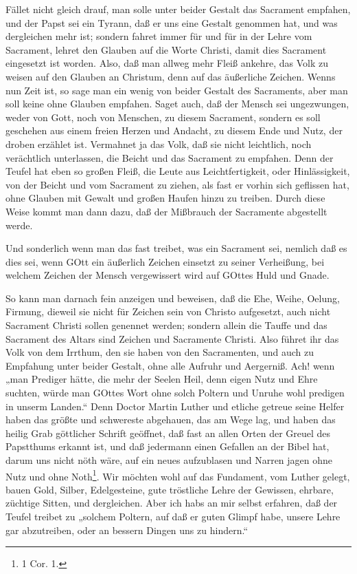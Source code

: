 Fället nicht gleich drauf, man solle unter beider Gestalt das Sacrament empfahen, und der Papst sei ein Tyrann, daß er uns eine Gestalt genommen hat, und was dergleichen mehr ist; sondern fahret immer für und für in der Lehre vom Sacrament, lehret den Glauben auf die Worte Christi, damit dies Sacrament eingesetzt ist worden. Also, daß man allweg mehr Fleiß ankehre, das Volk zu weisen auf den Glauben an Christum, denn auf das äußerliche Zeichen. Wenns nun Zeit ist, so sage man ein wenig von beider Gestalt des Sacraments, aber man soll keine ohne Glauben empfahen. Saget auch, daß der Mensch sei ungezwungen, weder von Gott, noch von Menschen,
zu diesem Sacrament, sondern es soll geschehen aus einem freien Herzen und Andacht, zu diesem Ende und Nutz, der droben erzählet ist. Vermahnet ja das Volk, daß sie nicht leichtlich, noch verächtlich unterlassen, die Beicht und das Sacrament zu empfahen. Denn der Teufel hat eben so großen Fleiß, die Leute aus Leichtfertigkeit, oder Hinlässigkeit, von der Beicht und vom Sacrament zu ziehen, als fast er vorhin sich geflissen hat, ohne Glauben mit Gewalt und großen Haufen hinzu zu treiben. Durch diese Weise kommt man dann dazu, daß der Mißbrauch der Sacramente abgestellt werde.

Und sonderlich wenn man das fast treibet, was ein Sacrament sei, nemlich daß es dies sei, wenn GOtt ein äußerlich Zeichen einsetzt zu seiner Verheißung, bei welchem Zeichen der Mensch vergewissert wird auf GOttes Huld und Gnade.

So kann man darnach fein anzeigen und beweisen, daß die Ehe, Weihe, Oelung, Firmung, dieweil sie nicht für Zeichen sein von Christo aufgesetzt, auch nicht Sacrament Christi sollen genennet werden; sondern allein die Tauffe und das Sacrament des Altars sind Zeichen und Sacramente Christi. Also führet ihr das Volk von dem Irrthum, den sie haben von den Sacramenten, und auch zu Empfahung unter beider Gestalt, ohne alle Aufruhr und Aergerniß. Ach! wenn „man Prediger hätte, die mehr der Seelen Heil, denn eigen Nutz und Ehre suchten, würde man GOttes Wort ohne solch Poltern und Unruhe wohl predigen in unserm Landen.“ Denn Doctor Martin Luther und etliche getreue seine Helfer haben das größte und schwereste abgehauen, das am Wege lag, und haben das heilig Grab göttlicher Schrift geöffnet, daß fast an allen Orten der Greuel des Papstthums erkannt ist, und daß jedermann einen Gefallen an der Bibel hat, darum uns nicht nöth wäre,
auf ein neues aufzublasen und Narren jagen ohne Nutz und ohne Noth\footnote{1 Cor. 1.}. Wir möchten wohl auf das Fundament, vom Luther gelegt, bauen Gold, Silber, Edelgesteine, gute tröstliche Lehre der Gewissen, ehrbare, züchtige Sitten, und dergleichen. Aber ich habs an mir selbst erfahren, daß der Teufel treibet zu „solchem Poltern, auf daß er guten Glimpf habe, unsere Lehre gar abzutreiben, oder an bessern Dingen uns zu hindern.“

